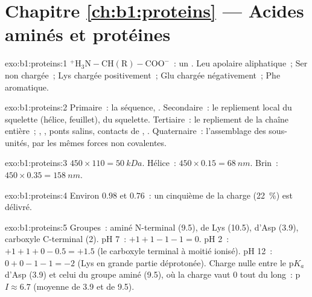 \section*{Chapitre \ref{ch:b1:proteins} --- Acides aminés et protéines}

\begin{solution}{exo:b1:proteins:1}
$\mathrm{^+H_3N{-}CH(R){-}COO^-}$~: un . Leu apolaire
aliphatique~; Ser  non chargée~; Lys chargée positivement~; Glu
chargée négativement~; Phe aromatique.
\end{solution}

\begin{solution}{exo:b1:proteins:2}
Primaire~: la séquence, . Secondaire~: le repliement
local du squelette (hélice, feuillet),  du squelette.
Tertiaire~: le repliement de la chaîne entière~; ,
, ponts salins, contacts de , . Quaternaire~: l'assemblage des sous-unités, par les mêmes
forces non covalentes.
\end{solution}

\begin{solution}{exo:b1:proteins:3}
$450\times 110 = \qty{50}{kDa}$. Hélice~: $450\times 0.15 = \qty{68}{nm}$.
Brin~: $450\times 0.35 = \qty{158}{nm}$.
\end{solution}

\begin{solution}{exo:b1:proteins:4}
Environ $0.98$ et $0.76$~: un cinquième de la charge (\qty{22}{\%}) est
délivré.
\end{solution}

\begin{solution}{exo:b1:proteins:5}
Groupes~: aminé N-terminal (9.5),  de Lys (10.5),  d'Asp (3.9), carboxyle C-terminal (2). pH 7~:
$+1 + 1 - 1 - 1 = 0$. pH 2~: $+1 + 1 + 0 - 0.5 = +1.5$ (le carboxyle
terminal à moitié ionisé). pH 12~: $0 + 0 - 1 - 1 = -2$ (Lys en grande
partie déprotonée). Charge nulle entre le p$K_a$ d'Asp (3.9) et celui du
groupe aminé (9.5), où la charge vaut $0$ tout du long~:
p$I \approx 6.7$ (moyenne de 3.9 et de 9.5).
\end{solution}

